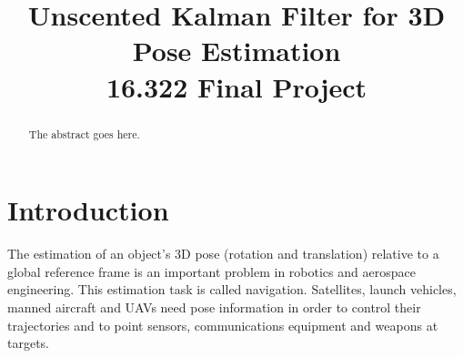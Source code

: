\documentclass[conference]{IEEEtran}
\begin{document}
%
\title{Unscented Kalman Filter for 3D Pose Estimation\\16.322 Final Project}


\author{
}


\maketitle

\begin{abstract}
The abstract goes here.
\end{abstract}





%
\IEEEpeerreviewmaketitle



\section{Introduction}
The estimation of an object's 3D pose (rotation and translation) relative to a global reference frame is an important problem in robotics and aerospace engineering. This estimation task is called navigation. Satellites, launch vehicles, manned aircraft and UAVs need pose information in order to control their trajectories and to point sensors, communications equipment and weapons at targets.\\
\end{document}
